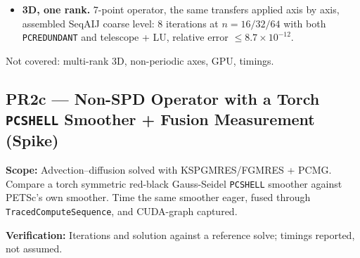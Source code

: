 \documentclass[11pt]{article}
\newcommand{\pr}[2]{\subsection{PR#1 --- #2}}
\begin{document}
{\begin{itemize}[leftmargin=*]
torch shell. The coarse DMDAs and their partitions come from \texttt{DMCoarsen},
the coarse levels are rediscretised and assembled with
\texttt{MatSetValuesStencil} (scaled by $4^k$ because PCMG restricts with
$P^T$; a preconditioner-level convention), and the transfers come from the DM or
are assembled from our stencil. The depth no longer depends on the rank grid:
$n=112$ on $2\times4$ keeps 4 levels (coarse $n=14$), 9 iterations. Iterations at
np $=1/2/4/8$, $n=64/96/112/256$:
cell-centred bilinear (our stencil, assembled) 9 at every case, equal to the
single-rank torch-shell hierarchy; \texttt{DMDA\_Q1} 9--10; \texttt{DMDA\_Q0}
17--19. The fully automatic path (\texttt{KSPSetDM} + \texttt{KSPSetComputeOperators},
PCMG coarsens and builds Q1 itself) gives the same counts as the hand-built Q1
hierarchy. PETSc's coarse partition is chosen for vertex-based transfers, so our
cell-centred interpolation is assembled with global column indices (a needed
coarse cell can lie outside the one-cell ghost frame). \textbf{Decided (user,
2026-10-18):} adopt this hierarchy (Section~\ref{sec:hybrid}) with the
cell-centred transfer (exact for our cell-centred grid; Q1 is node-centred).
\item \textbf{3D, one rank.} 7-point operator, the same transfers applied axis
by axis, assembled SeqAIJ coarse level: 8 iterations at $n=16/32/64$ with both
\texttt{PCREDUNDANT} and telescope + LU, relative error $\le 8.7\times10^{-12}$.
\end{itemize}
Not covered: multi-rank 3D, non-periodic axes, GPU, timings.}

\pr{2c}{Non-SPD Operator with a Torch \texttt{PCSHELL} Smoother + Fusion Measurement (Spike)}
\textbf{Scope:} Advection--diffusion solved with KSPGMRES/FGMRES + PCMG.
Compare a torch symmetric red-black Gauss-Seidel \texttt{PCSHELL} smoother
against PETSc's own smoother. Time the same smoother eager, fused through
\texttt{TracedComputeSequence}, and CUDA-graph captured.

\textbf{Verification:} Iterations and solution against a reference solve;
timings reported, not assumed.
\end{document}

